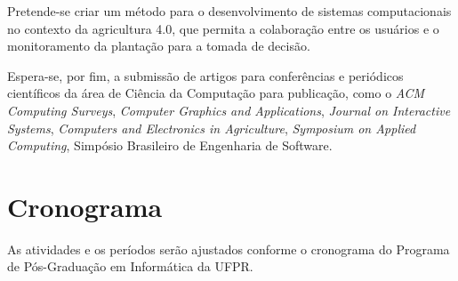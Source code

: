 \documentclass[12pt]{article}
\begin{document}
Pretende-se criar um método para o desenvolvimento de sistemas computacionais no contexto da agricultura 4.0, que permita a colaboração entre os usuários e o monitoramento da plantação para a tomada de decisão.

Espera-se, por fim, a submissão de artigos para conferências e periódicos científicos da área de Ciência da Computação para publicação, como o \textit{ACM Computing Surveys}, \textit{Computer Graphics and Applications}, \textit{Journal on Interactive Systems}, \textit{Computers and Electronics in Agriculture}, \textit{Symposium on Applied Computing}, Simpósio Brasileiro de Engenharia de Software.

\section{Cronograma}
\label{sec:cronograma}

As atividades e os períodos serão ajustados conforme o cronograma do Programa de Pós-Graduação em Informática da UFPR.
\end{document}
